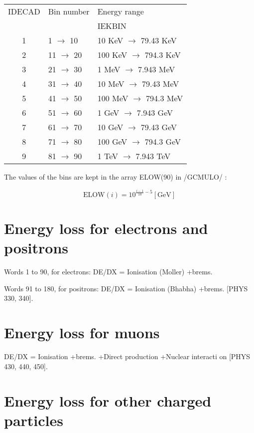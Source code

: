 \begin{center}
\begin{tabular}{|c|l|l|}
\hline
IDECAD  &Bin number  &Energy range \\
& &IEKBIN    \\
\hline
 
1  &1 $\rightarrow$ 10  &10 KeV $\rightarrow$ 79.43 KeV          \\
2  &11 $\rightarrow$ 20  &100 KeV $\rightarrow$ 794.3 KeV       \\
3  &21 $\rightarrow$ 30  &1 MeV $\rightarrow$ 7.943 MeV           \\
4  &31 $\rightarrow$ 40  &10 MeV $\rightarrow$ 79.43 MeV         \\
5  &41 $\rightarrow$ 50  &100 MeV $\rightarrow$ 794.3 MeV       \\
6  &51 $\rightarrow$ 60  &1 GeV $\rightarrow$ 7.943 GeV           \\
7  &61 $\rightarrow$ 70  &10 GeV $\rightarrow$ 79.43 GeV         \\
8  &71 $\rightarrow$ 80  &100 GeV $\rightarrow$ 794.3 GeV       \\
9  &81 $\rightarrow$ 90  &1 TeV $\rightarrow$ 7.943 TeV           \\
\hline
\end{tabular}
\end{center}
 
The values of the bins are kept in the array ELOW(90) in /GCMULO/ :
 
\[
 \mbox{ELOW}(i) = 10 ^ { \frac{i-1}{10} - 5 } [ \mbox{GeV} ]
\]
 
\section{Energy loss for electrons and positrons}
 
Words 1 to 90, for electrons:  DE/DX = Ionisation (Moller) +brems.
 
Words 91 to 180, for positrons:  DE/DX = Ionisation (Bhabha) +brems.
[PHYS 330, 340].
 
\section{Energy loss for muons}
 
  DE/DX = Ionisation +brems. +Direct \Pep\Pem production +Nuclear interacti     on
[PHYS 430, 440, 450].
 
\section{Energy loss for other charged particles}
 
